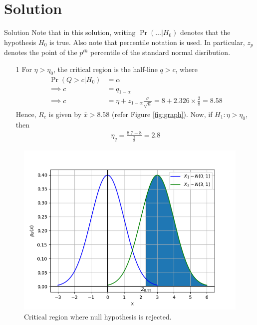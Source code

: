 \documentclass{beamer}
\providecommand{\pr}[1]{\ensuremath{\Pr\left(#1\right)}}
\begin{document}
\section{Solution}
\begin{frame}{Solution}
	Note that in this solution, writing $\pr{\ldots | H_0}$ denotes that the hypothesis $H_0$ is true. Also note that percentile notation is used. In particular, $z_p$ denotes the point of the $p^{th}$ percentile of the standard normal disribution.
	\begin{enumerate}
		\item[1] For $\eta > \eta_0$, the critical region is the half-line $q > c$, where 
			\begin{align}
				\pr{Q > c | H_0} &= \alpha \\
				\implies c &= q_{1 - \alpha} \\
				\implies c &= \eta + z_{1 - \alpha}\frac{\sigma}{\sqrt{n}} = 8 + 2.326 \times \frac{2}{8} = 8.58
				\label{eq:r-c}
			\end{align}
			Hence, $R_c$ is given by $\bar{x} > 8.58$ (refer Figure \eqref{fig:graph}). Now, if $H_1: \eta > \eta_0$, then
			\begin{align}
				\eta_q = \frac{8.7 - 8}{\frac{2}{8}} = 2.8
				\label{eq:new-eta}
			\end{align}
	\end{enumerate}
\end{frame}

\begin{frame}
	\begin{figure}
		\centering
		\includegraphics[height=0.8\textheight]{figs/14_1.png}
		\caption{Critical region where null hypothesis is rejected.}
		\label{fig:graph}
	\end{figure}
\end{frame}
\end{document}
